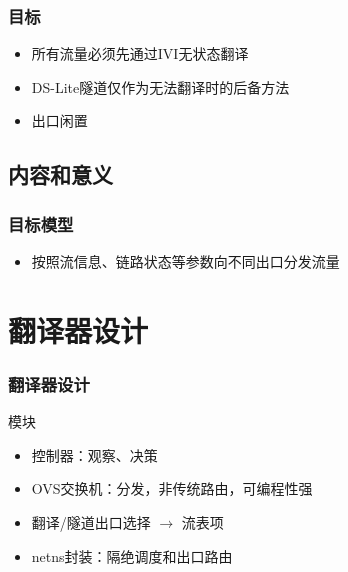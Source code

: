 \documentclass{beamer}
\begin{document}
\begin{frame}
  \frametitle{目标}

  \vspace{1em}

  \begin{block}{}
    \begin{itemize}
    \item 所有流量必须先通过IVI无状态翻译
    \item DS-Lite隧道仅作为无法翻译时的后备方法
    \item 出口闲置
    \end{itemize}
  \end{block}
\end{frame}

\subsection{内容和意义}
\begin{frame}
  \frametitle{目标模型}

  \begin{block}{}
    \begin{itemize}
    \item 按照流信息、链路状态等参数向不同出口分发流量
    \end{itemize}
  \end{block}
\end{frame}

\section{翻译器设计}
\begin{frame}
  \frametitle{翻译器设计}

  \begin{block}{模块}
    \begin{itemize}
    \item 控制器：观察、决策
    \item OVS交换机：分发，非传统路由，可编程性强
    \item 翻译/隧道出口选择 $\rightarrow$ 流表项
    \item netns封装：隔绝调度和出口路由
    \end{itemize}
  \end{block}
\end{frame}
\end{document}
